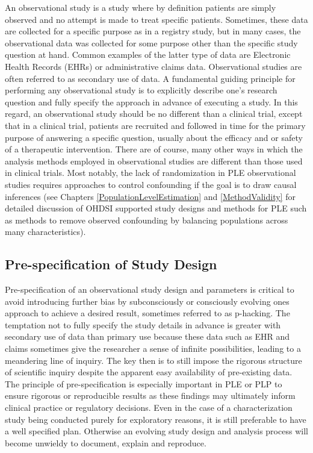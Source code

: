 \documentclass[11pt]{book}
\theoremstyle{definition}
\theoremstyle{definition}
\theoremstyle{definition}
\theoremstyle{remark}
\begin{document}
An observational study is a study where by definition patients are simply observed and no attempt is made to treat specific patients. Sometimes, these data are collected for a specific purpose as in a registry study, but in many cases, the observational data was collected for some purpose other than the specific study question at hand. Common examples of the latter type of data are Electronic Health Records (EHRs) or administrative claims data. Observational studies are often referred to as secondary use of data. A fundamental guiding principle for performing any observational study is to explicitly describe one's research question and fully specify the approach in advance of executing a study. In this regard, an observational study should be no different than a clinical trial, except that in a clinical trial, patients are recruited and followed in time for the primary purpose of answering a specific question, usually about the efficacy and or safety of a therapeutic intervention. There are of course, many other ways in which the analysis methods employed in observational studies are different than those used in clinical trials. Most notably, the lack of randomization in PLE observational studies requires approaches to control confounding if the goal is to draw causal inferences (see Chapters \ref{PopulationLevelEstimation} and \ref{MethodValidity} for detailed discussion of OHDSI supported study designs and methods for PLE such as methods to remove observed confounding by balancing populations across many characteristics).

\hypertarget{pre-specification-of-study-design}{%
\subsection{Pre-specification of Study Design}\label{pre-specification-of-study-design}}

Pre-specification of an observational study design and parameters is critical to avoid introducing further bias by subconsciously or consciously evolving ones approach to achieve a desired result, sometimes referred to as p-hacking. The temptation not to fully specify the study details in advance is greater with secondary use of data than primary use because these data such as EHR and claims sometimes give the researcher a sense of infinite possibilities, leading to a meandering line of inquiry. The key then is to still impose the rigorous structure of scientific inquiry despite the apparent easy availability of pre-existing data. The principle of pre-specification is especially important in PLE or PLP to ensure rigorous or reproducible results as these findings may ultimately inform clinical practice or regulatory decisions. Even in the case of a characterization study being conducted purely for exploratory reasons, it is still preferable to have a well specified plan. Otherwise an evolving study design and analysis process will become unwieldy to document, explain and reproduce.
\end{document}
